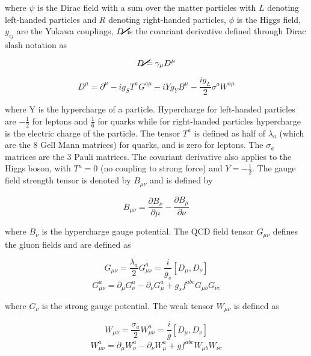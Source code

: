 \noindent where $\psi$ is the Dirac field with a sum over the matter particles with $L$ denoting left-handed particles and $R$ denoting right-handed particles, $\phi$ is the Higgs field, $y_{ij}$ are the Yukawa couplings, $\cancel{D}$ is the covariant derivative defined through Dirac slash notation as 

\begin{equation}
\cancel{D}=\gamma_\mu D^\mu
\end{equation}

\begin{equation}
D^\mu=\partial^\mu - i g_S T^a G^{a\mu} - i Y g_Y B^\mu - \frac{i g_L}{2}\sigma ^a W^{a \mu} 
\end{equation}


\noindent where Y is the hypercharge of a particle. Hypercharge for left-handed particles are $-\frac{1}{2}$ for leptons and $\frac{1}{6}$ for quarks while for right-handed particles hypercharge is the electric charge of the particle. The tensor $T^a$ is defined as half of $\lambda_a$ (which are the 8 Gell Mann matrices) for quarks, and is zero for leptons. The $\sigma_a$ matrices are the 3 Pauli matrices. The covariant derivative also applies to the Higgs boson, with $T^a=0$ (no coupling to strong force) and $Y=-\frac{1}{2}$. The gauge field strength tensor is denoted by $B_{\mu \nu}$ and is defined by 
 
\begin{equation}
B_{\mu \nu} = \frac{\partial B_\nu}{\partial \mu} - \frac{\partial B_\mu}{\partial \nu}
\end{equation}


\noindent where $B_\nu$ is the hypercharge gauge potential. The QCD field tensor $G_{\mu\nu}$ defines the gluon fields and are defined as 


\begin{equation}
G_{\mu\nu}=\frac{\lambda_a}{2} G_{\mu\nu}^a=\frac{i}{g_s}[D_\mu ,D_\nu]
\end{equation}
\begin{equation}
G_{\mu\nu}^a=\partial_\mu G_\nu^ a - \partial_\nu G_\mu^a + g_s f^{abc} G_{\mu b} G_{\nu c}
\end{equation}

\noindent where $G_\nu$ is the strong gauge potential. The weak tensor $W_{\mu\nu}$ is defined as 

\begin{equation}
W_{\mu\nu}=\frac{\sigma_a}{2} W_{\mu\nu}^a=\frac{i}{g}[D_\mu ,D_\nu]
\end{equation}
\begin{equation}
W_{\mu\nu}^a=\partial_\mu W_\nu^ a - \partial_\nu W_\mu^a + g f^{abc} W_{\mu b} W_{\nu c}
\end{equation}

